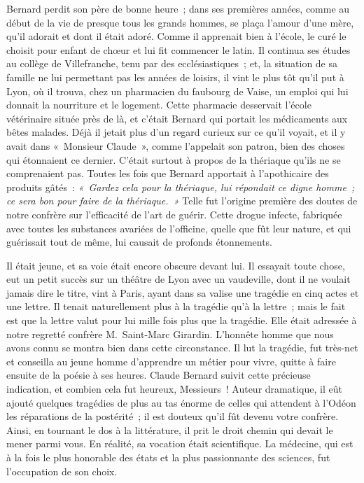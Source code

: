 \documentclass[french,twoside]{book} %
\newcommand\orgName[1]{#1}
\newcommand\persName[1]{#1}
\newcommand\placeName[1]{#1}
\begin{document}
{\persName Bernard} perdit son père de bonne heure ; dans ses premières années, comme au début de la vie de presque tous les grands hommes, se plaça l’amour d’une mère, qu’il adorait et dont il était adoré. Comme il apprenait bien à l’école, le curé le choisit pour enfant de chœur et lui fit commencer le latin. Il continua ses études au {\placeName collège de Villefranche}, tenu par des ecclésiastiques ; et, la situation de sa famille ne lui permettant pas les années de loisirs, il vint le plus tôt qu’il put à {\placeName Lyon}, où il trouva, chez un pharmacien du {\placeName faubourg de Vaise}, un emploi qui lui donnait la nourriture et le logement. Cette pharmacie desservait l’école vétérinaire située près de là, et c’était {\persName Bernard} qui portait les médicaments aux bêtes malades. Déjà il jetait plus d’un regard curieux sur ce qu’il voyait, et il y avait dans « {\persName Monsieur Claude} », comme l’appelait son patron, bien des choses qui étonnaient ce dernier. C’était surtout à propos de la thériaque qu’ils ne se comprenaient pas. Toutes les fois que {\persName Bernard} apportait à l’apothicaire des produits gâtés : \emph{« Gardez cela pour la thériaque, lui répondait ce digne homme ; ce sera bon pour faire de la thériaque. »} Telle fut l’origine première des doutes de notre confrère sur l’efficacité de l’art de guérir. Cette drogue infecte, fabriquée avec toutes les substances avariées de l’officine, quelle que fût leur nature, et qui guérissait tout de même, lui causait de profonds étonnements.\par
Il était jeune, et sa voie était encore obscure devant lui. Il essayait toute chose, eut un petit succès sur un théâtre de {\placeName Lyon} avec un vaudeville, dont il ne voulait jamais dire le titre, vint à {\placeName Paris}, ayant dans sa valise une tragédie en cinq actes et une lettre. Il tenait naturellement plus à la tragédie qu’à la lettre ; mais le fait est que la lettre valut pour lui mille fois plus que la tragédie. Elle était adressée à notre regretté confrère {\persName M. Saint-Marc Girardin}. L’honnête homme que nous avons connu se montra bien dans cette circonstance. Il lut la tragédie, fut très-net et conseilla au jeune homme d’apprendre un métier pour vivre, quitte à faire ensuite de la poésie à ses heures. {\persName Claude Bernard} suivit cette précieuse indication, et combien cela fut heureux, Messieurs ! Auteur dramatique, il eût ajouté quelques tragédies de plus au tas énorme de celles qui attendent à l’{\orgName Odéon} les réparations de la postérité ; il est douteux qu’il fût devenu votre confrère. Ainsi, en tournant le dos à la littérature, il prit le droit chemin qui devait le mener parmi vous. En réalité, sa vocation était scientifique. La médecine, qui est à la fois le plus honorable des états et la plus passionnante des sciences, fut l’occupation de son choix.\par
\end{document}
